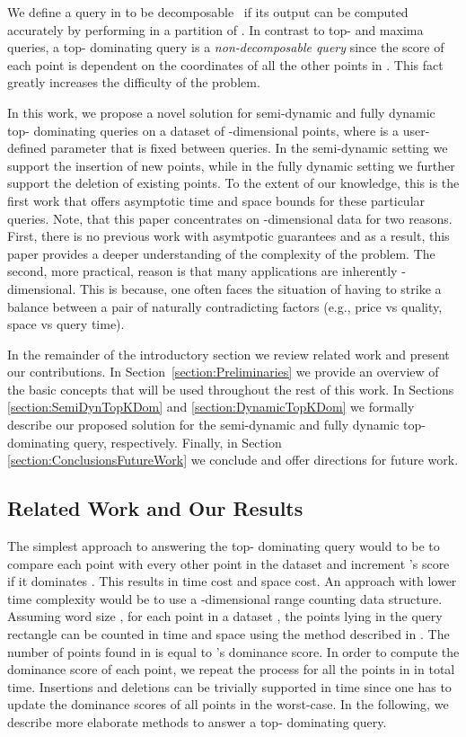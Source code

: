 \documentclass{llncs}
\begin{document}
We define a query  in  to be decomposable~\cite{BenSax80} if its output can be computed accurately by performing  in a partition of . In contrast to top- and maxima queries, a top- dominating query is a \emph{non-decomposable query} since the score of each point is dependent on the coordinates of all the other points in . This fact greatly increases the difficulty of the problem.

In this work, we propose a novel solution for semi-dynamic and fully dynamic top- dominating queries on a dataset  of -dimensional points, where  is a user-defined parameter that is fixed between queries. In the semi-dynamic setting we support the insertion of new points, while in the fully dynamic setting we further support the deletion of existing points. To the extent of our knowledge, this is the first work that offers asymptotic time and space bounds for these particular queries. Note, that this paper concentrates on -dimensional data for two reasons. First, there is no previous work with asymtpotic guarantees and as a result, this paper provides a deeper understanding of the complexity of the problem. The second, more practical, reason is that many applications are inherently -dimensional. This is because, one often faces the situation of having to strike a balance between a pair of naturally contradicting
factors (e.g., price vs quality, space vs query time).

In the remainder of the introductory section we review related work and present our contributions. In Section~\ref{section:Preliminaries} we provide an overview of the basic concepts that will be used throughout the rest of this work. In Sections \ref{section:SemiDynTopKDom} and \ref{section:DynamicTopKDom} we formally describe our proposed solution for the semi-dynamic and fully dynamic top- dominating query, respectively. Finally, in Section \ref{section:ConclusionsFutureWork} we conclude and offer directions for future work.





\subsection{Related Work and Our Results} \label{subsection:RelatedWork}
The simplest approach to answering the top- dominating query would to be to compare each point  with every other point  in the dataset and increment 's score if it dominates . This results in  time cost and  space cost. An approach with lower time complexity would be to use a -dimensional range counting data structure. Assuming word size , for each point  in a dataset , the points lying in the query rectangle  can be counted in  time and  space using the method described in \cite{HeMunroWADS11}. The number of points found in  is equal to 's dominance score. In order to compute the dominance score of each point, we repeat the process for all the points in  in  total time. Insertions and deletions can be trivially supported in  time since one has to update the dominance scores of all points in the worst-case. In the following, we describe more elaborate methods to answer a top- dominating query.
\end{document}
